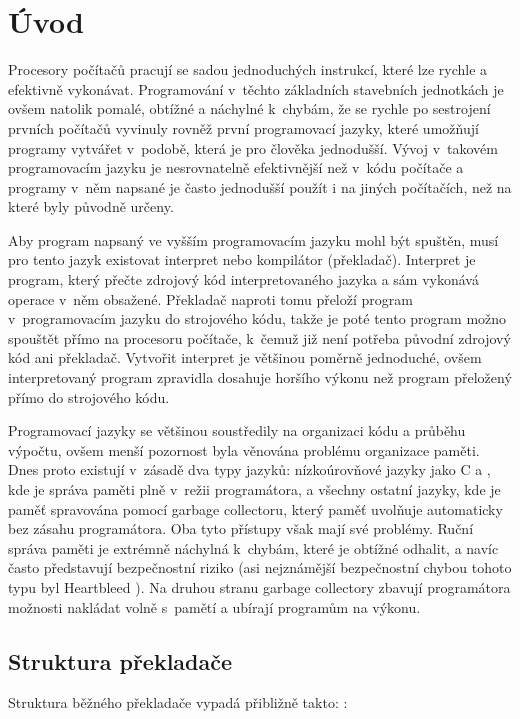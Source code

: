 \chapter{Úvod}

Procesory počítačů pracují se sadou jednoduchých instrukcí, které lze rychle a
efektivně vykonávat. Programování v~těchto základních stavebních jednotkách je
ovšem natolik pomalé, obtížné a náchylné k~chybám, že se rychle po sestrojení
prvních počítačů vyvinuly rovněž první programovací jazyky, které umožňují
programy vytvářet v~podobě, která je pro člověka jednodušší. Vývoj v~takovém
programovacím jazyku je nesrovnatelně efektivnější než v~kódu počítače a
programy v~něm napsané je často jednodušší použít i na jiných počítačích, než na
které byly původně určeny.

Aby program napsaný ve vyšším programovacím jazyku mohl být spuštěn, musí pro
tento jazyk existovat interpret nebo kompilátor (překladač). Interpret je
program, který přečte zdrojový kód interpretovaného jazyka a sám vykonává
operace v~něm obsažené. Překladač naproti tomu přeloží program v~programovacím
jazyku do strojového kódu, takže je poté tento program možno spouštět přímo na
procesoru počítače, k~čemuž již není potřeba původní zdrojový kód ani překladač.
Vytvořit interpret je většinou poměrně jednoduché, ovšem interpretovaný program
zpravidla dosahuje horšího výkonu než program přeložený přímo  do strojového
kódu.

Programovací jazyky se většinou soustředily na organizaci kódu a průběhu
výpočtu, ovšem menší pozornost byla věnována problému organizace paměti. Dnes
proto existují v~zásadě dva typy jazyků: nízkoúrovňové jazyky jako C a
\Cplusplus, kde je správa paměti plně v~režii programátora, a všechny ostatní
jazyky, kde je paměť spravována pomocí garbage collectoru, který paměť uvolňuje
automaticky bez zásahu programátora. Oba tyto přístupy však mají své problémy.
Ruční správa paměti je extrémně náchylná k~chybám, které je obtížné odhalit, a
navíc často představují bezpečnostní riziko (asi nejznámější bezpečnostní chybou
tohoto typu byl Heartbleed \cite{heartbleed}). Na druhou stranu garbage
collectory zbavují programátora možnosti nakládat volně s~pamětí a ubírají
programům na výkonu.

\section{Struktura překladače}

Struktura běžného překladače vypadá přibližně takto:
\cite{grune2012modern,appel1998modern}:

